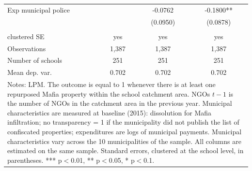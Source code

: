 \documentclass[12pt]{article}
\theoremstyle{plain}
\theoremstyle{plain}
\theoremstyle{plain}
\theoremstyle{definition}
\theoremstyle{plain}
\theoremstyle{definition}
\theoremstyle{plain}
\theoremstyle{remark}
\theoremstyle{definition}
\theoremstyle{definition}
\theoremstyle{plain}
\begin{document}
\begin{table}[H]
{\begin{tabular}{p{9.28em}lll}
    \multicolumn{1}{l}{Exp municipal police} & \multicolumn{1}{c}{} & \multicolumn{1}{c}{-0.0762} & \multicolumn{1}{c}{-0.1800**} \\
    \multicolumn{1}{l}{} & \multicolumn{1}{c}{} & \multicolumn{1}{c}{(0.0950)} & \multicolumn{1}{c}{(0.0878)} \\
    \multicolumn{1}{l}{} & & & \\
    \multicolumn{1}{l}{clustered SE} & \multicolumn{1}{c}{yes} & \multicolumn{1}{c}{yes} & \multicolumn{1}{c}{yes} \\
    \multicolumn{1}{l}{Observations} & \multicolumn{1}{c}{1,387} & \multicolumn{1}{c}{1,387} & \multicolumn{1}{c}{1,387} \\
    \multicolumn{1}{l}{Number of schools} & \multicolumn{1}{c}{251} & \multicolumn{1}{c}{251} & \multicolumn{1}{c}{251} \\
    \multicolumn{1}{l}{Mean dep. var.} & \multicolumn{1}{c}{0.702} & \multicolumn{1}{c}{0.702} & \multicolumn{1}{c}{0.702} \\
    \midrule
    \multicolumn{4}{p{24.28em}}{Notes: LPM. The outcome is equal to 1 whenever there is at least one repurposed Mafia property within the school catchment area. NGOs $t-1$ is the number of NGOs in the catchment area in the previous year. Municipal characteristics are measured at baseline (2015): dissolution for Mafia infiltration; no transparency = 1 if the municipality did not publish the list of confiscated properties; expenditures are logs of municipal payments. Municipal characteristics vary across the 10 municipalities of the sample. All columns are estimated on the same sample. Standard errors, clustered at the school level, in parentheses. *** p$<$0.01, ** p$<$0.05, * p$<$0.1.} \\
    \end{tabular}%
    }
    \end{table}
\end{document}

